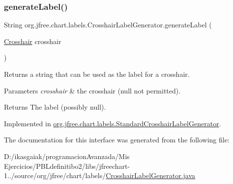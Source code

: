 \subsubsection{\texorpdfstring{generate\+Label()}{generateLabel()}}
{\footnotesize\ttfamily String org.\+jfree.\+chart.\+labels.\+Crosshair\+Label\+Generator.\+generate\+Label (\begin{DoxyParamCaption}\item[{\mbox{\hyperlink{classorg_1_1jfree_1_1chart_1_1plot_1_1_crosshair}{Crosshair}}}]{crosshair }\end{DoxyParamCaption})}

Returns a string that can be used as the label for a crosshair.


\begin{DoxyParams}{Parameters}
{\em crosshair} & the crosshair ({\ttfamily null} not permitted).\\
\hline
\end{DoxyParams}
\begin{DoxyReturn}{Returns}
The label (possibly {\ttfamily null}). 
\end{DoxyReturn}


Implemented in \mbox{\hyperlink{classorg_1_1jfree_1_1chart_1_1labels_1_1_standard_crosshair_label_generator_a85bf6b7d24554c7421f00887756f0a08}{org.\+jfree.\+chart.\+labels.\+Standard\+Crosshair\+Label\+Generator}}.



The documentation for this interface was generated from the following file\+:\begin{DoxyCompactItemize}
\item 
D\+:/ikasgaiak/programacion\+Avanzada/\+Mis Ejercicios/\+P\+B\+Ldefinitibo2/libs/jfreechart-\/1../source/org/jfree/chart/labels/\mbox{\hyperlink{_crosshair_label_generator_8java}{Crosshair\+Label\+Generator.\+java}}\end{DoxyCompactItemize}
